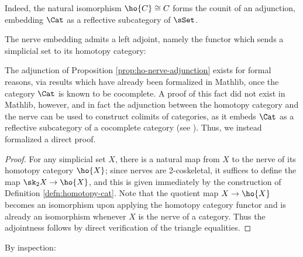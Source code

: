    Indeed, the natural isomorphism $\ho{C} \cong C$ forms the counit of an adjunction, embedding $\Cat$ as a reflective subcategory of $\sSet$.

   \begin{proposition}\label{prop:ho-nerve-adjunction}
    \leanok
    The nerve embedding admits a left adjoint, namely the functor which sends a simplicial set to its homotopy category:
   \begin{center}
   \end{center}
   \end{proposition}

   The adjunction of Proposition \ref{prop:ho-nerve-adjunction} exists for formal reasons, via results which have already been formalized in Mathlib, %
   once the category $\Cat$ is known to be cocomplete. A proof of this fact did not exist in Mathlib, however, and in fact the adjunction between the homotopy category and the nerve can be used to construct colimits of categories, as it embeds $\Cat$ as a reflective subcategory of a cocomplete category (see \cite[4.5.16]{Riehl:2016cc}). Thus, we instead formalized a direct proof.

   \begin{proof}
    \leanok
    For any simplicial set $X$, there is a natural map from $X$ to the nerve of its homotopy category $\ho{X}$; since nerves are 2-coskeletal, it suffices to define the map $\sk_2X \to \ho{X}$, and this is given immediately by the construction of Definition \ref{defn:homotopy-cat}. Note that the quotient map $X \to \ho{X}$ becomes an isomorphism upon applying the homotopy category functor and is already an isomorphism whenever $X$ is the nerve of a category. Thus the adjointness follows %
    by direct verification of the triangle equalities.
 \end{proof}

   By inspection:

